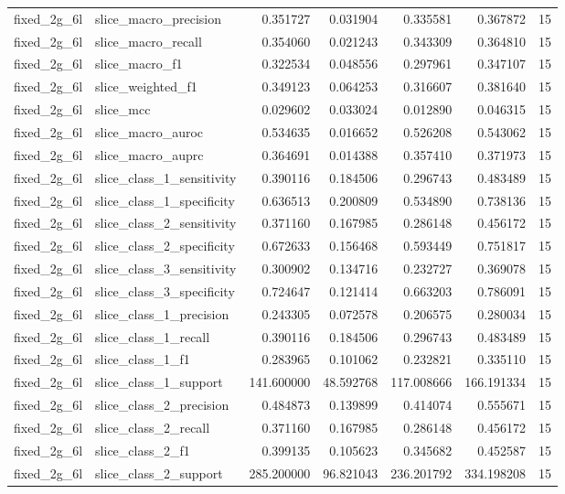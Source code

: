 \begin{tabular}{llrrrrr}
fixed_2g_6l & slice_macro_precision & 0.351727 & 0.031904 & 0.335581 & 0.367872 & 15 \\
fixed_2g_6l & slice_macro_recall & 0.354060 & 0.021243 & 0.343309 & 0.364810 & 15 \\
fixed_2g_6l & slice_macro_f1 & 0.322534 & 0.048556 & 0.297961 & 0.347107 & 15 \\
fixed_2g_6l & slice_weighted_f1 & 0.349123 & 0.064253 & 0.316607 & 0.381640 & 15 \\
fixed_2g_6l & slice_mcc & 0.029602 & 0.033024 & 0.012890 & 0.046315 & 15 \\
fixed_2g_6l & slice_macro_auroc & 0.534635 & 0.016652 & 0.526208 & 0.543062 & 15 \\
fixed_2g_6l & slice_macro_auprc & 0.364691 & 0.014388 & 0.357410 & 0.371973 & 15 \\
fixed_2g_6l & slice_class_1_sensitivity & 0.390116 & 0.184506 & 0.296743 & 0.483489 & 15 \\
fixed_2g_6l & slice_class_1_specificity & 0.636513 & 0.200809 & 0.534890 & 0.738136 & 15 \\
fixed_2g_6l & slice_class_2_sensitivity & 0.371160 & 0.167985 & 0.286148 & 0.456172 & 15 \\
fixed_2g_6l & slice_class_2_specificity & 0.672633 & 0.156468 & 0.593449 & 0.751817 & 15 \\
fixed_2g_6l & slice_class_3_sensitivity & 0.300902 & 0.134716 & 0.232727 & 0.369078 & 15 \\
fixed_2g_6l & slice_class_3_specificity & 0.724647 & 0.121414 & 0.663203 & 0.786091 & 15 \\
fixed_2g_6l & slice_class_1_precision & 0.243305 & 0.072578 & 0.206575 & 0.280034 & 15 \\
fixed_2g_6l & slice_class_1_recall & 0.390116 & 0.184506 & 0.296743 & 0.483489 & 15 \\
fixed_2g_6l & slice_class_1_f1 & 0.283965 & 0.101062 & 0.232821 & 0.335110 & 15 \\
fixed_2g_6l & slice_class_1_support & 141.600000 & 48.592768 & 117.008666 & 166.191334 & 15 \\
fixed_2g_6l & slice_class_2_precision & 0.484873 & 0.139899 & 0.414074 & 0.555671 & 15 \\
fixed_2g_6l & slice_class_2_recall & 0.371160 & 0.167985 & 0.286148 & 0.456172 & 15 \\
fixed_2g_6l & slice_class_2_f1 & 0.399135 & 0.105623 & 0.345682 & 0.452587 & 15 \\
fixed_2g_6l & slice_class_2_support & 285.200000 & 96.821043 & 236.201792 & 334.198208 & 15 \\

\end{tabular}
